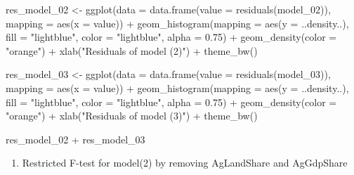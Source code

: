 \documentclass[
  letterpaper,
  DIV=11,
  numbers=noendperiod]{scrartcl}
\newenvironment{Shaded}{\begin{snugshade}}{\end{snugshade}}
\newcommand{\AttributeTok}[1]{\textcolor[rgb]{0.40,0.45,0.13}{#1}}
\newcommand{\FloatTok}[1]{\textcolor[rgb]{0.68,0.00,0.00}{#1}}
\newcommand{\FunctionTok}[1]{\textcolor[rgb]{0.28,0.35,0.67}{#1}}
\newcommand{\NormalTok}[1]{\textcolor[rgb]{0.00,0.23,0.31}{#1}}
\newcommand{\OtherTok}[1]{\textcolor[rgb]{0.00,0.23,0.31}{#1}}
\newcommand{\SpecialCharTok}[1]{\textcolor[rgb]{0.37,0.37,0.37}{#1}}
\newcommand{\StringTok}[1]{\textcolor[rgb]{0.13,0.47,0.30}{#1}}
\providecommand{\tightlist}{%
  \setlength{\itemsep}{0pt}\setlength{\parskip}{0pt}}\usepackage{longtable,booktabs,array}
\begin{document}
\begin{Shaded}
\begin{Highlighting}[]
\NormalTok{res\_model\_02 }\OtherTok{\textless{}{-}} \FunctionTok{ggplot}\NormalTok{(}\AttributeTok{data =} \FunctionTok{data.frame}\NormalTok{(}\AttributeTok{value =} \FunctionTok{residuals}\NormalTok{(model\_02)), }
             \AttributeTok{mapping =} \FunctionTok{aes}\NormalTok{(}\AttributeTok{x =}\NormalTok{ value)) }\SpecialCharTok{+}
  \FunctionTok{geom\_histogram}\NormalTok{(}\AttributeTok{mapping =} \FunctionTok{aes}\NormalTok{(}\AttributeTok{y =}\NormalTok{ ..density..), }
                 \AttributeTok{fill =} \StringTok{"lightblue"}\NormalTok{, }\AttributeTok{color =} \StringTok{"lightblue"}\NormalTok{,}
                 \AttributeTok{alpha =} \FloatTok{0.75}\NormalTok{) }\SpecialCharTok{+}
  \FunctionTok{geom\_density}\NormalTok{(}\AttributeTok{color =} \StringTok{"orange"}\NormalTok{) }\SpecialCharTok{+}
  \FunctionTok{xlab}\NormalTok{(}\StringTok{"Residuals of model (2)"}\NormalTok{) }\SpecialCharTok{+} 
  \FunctionTok{theme\_bw}\NormalTok{()}

\NormalTok{res\_model\_03 }\OtherTok{\textless{}{-}} \FunctionTok{ggplot}\NormalTok{(}\AttributeTok{data =} \FunctionTok{data.frame}\NormalTok{(}\AttributeTok{value =} \FunctionTok{residuals}\NormalTok{(model\_03)), }
             \AttributeTok{mapping =} \FunctionTok{aes}\NormalTok{(}\AttributeTok{x =}\NormalTok{ value)) }\SpecialCharTok{+}
  \FunctionTok{geom\_histogram}\NormalTok{(}\AttributeTok{mapping =} \FunctionTok{aes}\NormalTok{(}\AttributeTok{y =}\NormalTok{ ..density..), }
                 \AttributeTok{fill =} \StringTok{"lightblue"}\NormalTok{, }\AttributeTok{color =} \StringTok{"lightblue"}\NormalTok{,}
                 \AttributeTok{alpha =} \FloatTok{0.75}\NormalTok{) }\SpecialCharTok{+}
  \FunctionTok{geom\_density}\NormalTok{(}\AttributeTok{color =} \StringTok{"orange"}\NormalTok{) }\SpecialCharTok{+} 
  \FunctionTok{xlab}\NormalTok{(}\StringTok{"Residuals of model (3)"}\NormalTok{) }\SpecialCharTok{+} 
  \FunctionTok{theme\_bw}\NormalTok{()}

\NormalTok{res\_model\_02 }\SpecialCharTok{+}\NormalTok{ res\_model\_03}
\end{Highlighting}
\end{Shaded}

\begin{enumerate}
\def\labelenumi{\arabic{enumi}.}
\setcounter{enumi}{4}
\tightlist
\item
  Restricted F-test for model(2) by removing AgLandShare and AgGdpShare
\end{enumerate}
\end{document}
